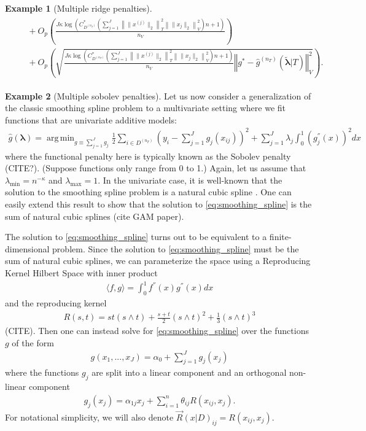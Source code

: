 \documentclass[12pt]{article} %
\theoremstyle{definition}
\newtheorem{example}{Example}
\DeclareMathOperator*{\argmin}{arg\,min}
\begin{document}
\begin{example}[Multiple ridge penalties]
\begin{align}
\begin{split}
	& \quad + O_p\left (
	\frac{J \kappa \log \left (
		C^*_{D^{(n_T)}} \left(
		\sum_{j = 1}^J \left \|\|x^{(j)} \|_2 \right \|_T^2 \left \|\|x_j\|_2 \right \|_V^2
		\right) n + 1
		\right )}{n_{V}}
	\right ) \\
	&\quad + O_p\left(
	\sqrt{\frac{J \kappa \log \left (
			C^*_{D^{(n_T)}} \left(
			\sum_{j = 1}^J \left \|\|x^{(j)} \|_2 \right \|_T^2 \left \|\|x_j\|_2 \right \|_V^2
			\right) n + 1
			\right )}{n_{V}}\left\Vert g^* - \hat{g}^{(n_T)}( \tilde{\boldsymbol{\lambda}} | T)\right\Vert_{V}^2}
	\right ).
	\end{split}
	\end{align}
\end{example}

\begin{example}[Multiple sobolev penalties]
	Let us now consider a generalization of the classic smoothing spline problem to a multivariate setting where we fit functions that are univariate additive models:
	\begin{align}
	\hat{g}(\boldsymbol{\lambda})
	= \argmin_{g \equiv \sum_{j=1}^J g_j}
	\frac{1}{2} \sum_{i\in D^{(n_T)}}
	\left(
	y_i - \sum_{j=1}^J g_j(x_{ij})
	\right)^2
	+ \sum_{j=1}^{J} \lambda_j \int_0^1 \left(g_j^{''}(x)\right)^{2} dx
	\label{eq:smoothing_spline}
	\end{align}
	where the functional penalty here is typically known as the Sobolev penalty (CITE?).
	(Suppose functions only range from 0 to 1.)
	Again, let us assume that $\lambda_{\min} = n^{-\kappa}$ and $\lambda_{\max} = 1$.
	In the univariate case, it is well-known that the solution to the smoothing spline problem is a natural cubic spline \citep{green1993nonparametric}.
	One can easily extend this result to show that the solution to \eqref{eq:smoothing_spline} is the sum of natural cubic splines (cite GAM paper).

	The solution to \eqref{eq:smoothing_spline} turns out to be equivalent to a finite-dimensional problem.
	Since the solution to \eqref{eq:smoothing_spline} must be the sum of natural cubic splines, we can parameterize the space using a Reproducing Kernel Hilbert Space with inner product
	\begin{align}
	\langle f, g \rangle = \int_{0}^1 f^{''}(x) g^{''}(x) dx
	\end{align}
	and the reproducing kernel
	\begin{align}
	R(s, t) = st(s \wedge t)
	+ \frac{s + t}{2} (s \wedge t)^2
	+ \frac{1}{3}
	(s \wedge t)^3
	\end{align}
	(CITE).
	Then one can instead solve for \eqref{eq:smoothing_spline} over the functions $g$ of the form
	\begin{align}
	g(x_1,..., x_J) = \alpha_0 + \sum_{j=1}^J g_j(x_j)
	\end{align}
	where the functions $g_j$ are split into a linear component and an orthogonal non-linear component
	\begin{align}
	g_j(x_j) = \alpha_{1j} x_j + \sum_{i=1}^n \theta_{ij} R(x_{ij}, x_j).
	\end{align}
	For notational simplicity, we will also denote $\vec{R}(x | D)_{ij} = R(x_{ij}, x_j)$.


\end{example}
\end{document}

